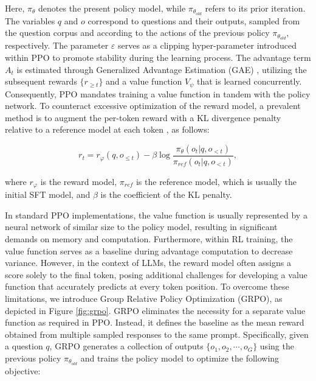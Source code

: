\begin{itemize}[topsep=0pt]
\begin{itemize}[topsep=0pt]
Here, $\pi_{\theta}$ denotes the present policy model, while $\pi_{\theta_{old}}$ refers to its prior iteration. The variables $q$ and $o$ correspond to questions and their outputs, sampled from the question corpus and according to the actions of the previous policy $\pi_{\theta_{old}}$, respectively. The parameter $\varepsilon$ serves as a clipping hyper-parameter introduced within PPO to promote stability during the learning process. The advantage term $A_t$ is estimated through Generalized Advantage Estimation (GAE) \citep{gae}, utilizing the subsequent rewards $\{r_{\ge t}\}$ and a value function $V_{\psi}$ that is learned concurrently. Consequently, PPO mandates training a value function in tandem with the policy network. To counteract excessive optimization of the reward model, a prevalent method is to augment the per-token reward with a KL divergence penalty relative to a reference model at each token \citep{ouyang2022training}, as follows:

\begin{equation}
    r_{t} = r_\varphi(q, o_{\le t}) - \beta \log\frac{\pi_{\theta}(o_{t}|q, o_{<t})}{\pi_{ref}(o_{t}|q, o_{<t})},
\label{eq:PPO-reward}
\end{equation}

where $r_\varphi$  is the reward model, $\pi_{ref}$ is the reference model, which is usually the initial SFT model, and $\beta$  is the coefficient of the KL penalty.

In standard PPO implementations, the value function is usually represented by a neural network of similar size to the policy model, resulting in significant demands on memory and computation. Furthermore, within RL training, the value function serves as a baseline during advantage computation to decrease variance. However, in the context of LLMs, the reward model often assigns a score solely to the final token, posing additional challenges for developing a value function that accurately predicts at every token position. To overcome these limitations, we introduce Group Relative Policy Optimization (GRPO), as depicted in Figure \ref{fig:grpo}. GRPO eliminates the necessity for a separate value function as required in PPO. Instead, it defines the baseline as the mean reward obtained from multiple sampled responses to the same prompt. Specifically, given a question $q$, GRPO generates a collection of outputs $\{o_1, o_2, \cdots, o_G\}$ using the previous policy $\pi_{\theta_{old}}$ and trains the policy model to optimize the following objective:


\end{itemize}
\end{itemize}
